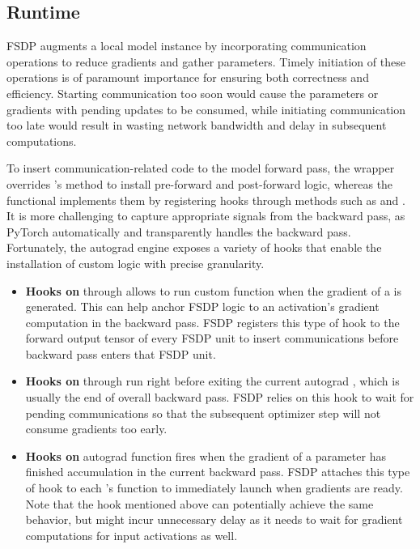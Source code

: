 \subsection{Runtime}

FSDP augments a local model instance by incorporating communication operations to reduce gradients and gather parameters. Timely initiation of these operations is of paramount importance for ensuring both correctness and efficiency. Starting communication too soon would cause the parameters or gradients with pending updates to be consumed, while initiating communication too late would result in wasting network bandwidth and delay in subsequent computations.

To insert communication-related code to the model forward pass, the   wrapper overrides 's  method to install pre-forward and post-forward logic, whereas the functional  implements them by registering  hooks through methods such as  and . It is more challenging to capture appropriate signals from the backward pass, as PyTorch automatically and transparently handles the backward pass. Fortunately, the autograd engine exposes a variety of hooks that enable the installation of custom logic with precise granularity.

\begin{itemize}
    \item \textbf{Hooks on } through  allows to run custom function when the gradient of a  is generated. This can help anchor FSDP logic to an activation's gradient computation in the backward pass. FSDP registers this type of hook to the forward output tensor of every FSDP unit to insert communications before backward pass enters that FSDP unit. 
    \item \textbf{Hooks on } through  run right before exiting the current autograd , which is usually the end of overall backward pass. FSDP relies on this hook to wait for pending communications so that the subsequent optimizer step will not consume gradients too early.
    \item \textbf{Hooks on } autograd function fires when the gradient of a parameter has finished accumulation in the current backward pass. FSDP attaches this type of hook to each 's  function to immediately launch  when gradients are ready. Note that the  hook mentioned above can potentially achieve the same behavior, but might incur unnecessary delay as it needs to wait for gradient computations for input activations as well. 
\end{itemize}

